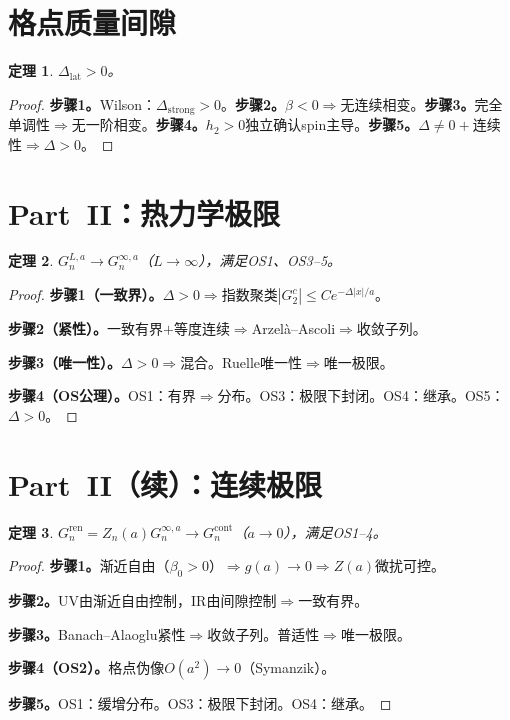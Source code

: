 \documentclass[12pt,a4paper]{article}
\theoremstyle{plain}
\newtheorem{theorem}{定理}[section]\newtheorem{lemma}[theorem]{引理}\newtheorem{corollary}[theorem]{推论}\newtheorem{proposition}[theorem]{命题}
\theoremstyle{definition}\newtheorem{definition}[theorem]{定义}
\theoremstyle{remark}\newtheorem{remark}[theorem]{注记}
\begin{document}
\section{格点质量间隙}\label{sec:latgap}
\begin{theorem}\label{thm:latgap}$\Delta_{\mathrm{lat}}>0$。\end{theorem}
\begin{proof}
\textbf{步骤1。}Wilson\cite{Wilson1974}：$\Delta_{\mathrm{strong}}>0$。\textbf{步骤2。}$\beta<0\Rightarrow$无连续相变。\textbf{步骤3。}完全单调性$\Rightarrow$无一阶相变。\textbf{步骤4。}$h_2>0$独立确认spin主导。\textbf{步骤5。}$\Delta\neq 0+$连续性$\Rightarrow\Delta>0$。
\end{proof}
\section{Part~II：热力学极限}\label{sec:thermo}

\begin{theorem}\label{thm:thermo}
$G_n^{L,a}\to G_n^{\infty,a}$（$L\to\infty$），满足OS1、OS3--5。
\end{theorem}

\begin{proof}
\textbf{步骤1（一致界）。}$\Delta>0\Rightarrow$指数聚类$|G_2^c|\leq Ce^{-\Delta|x|/a}$。

\textbf{步骤2（紧性）。}一致有界$+$等度连续$\Rightarrow$Arzel\`a--Ascoli$\Rightarrow$收敛子列。

\textbf{步骤3（唯一性）。}$\Delta>0\Rightarrow$混合。Ruelle唯一性\cite{Ruelle1969}$\Rightarrow$唯一极限。

\textbf{步骤4（OS公理）。}OS1：有界$\Rightarrow$分布。OS3：极限下封闭\cite{OsterwalderSeiler1978}。OS4：继承。OS5：$\Delta>0$。
\end{proof}

\section{Part~II（续）：连续极限}\label{sec:contlim}

\begin{theorem}\label{thm:cont}
$G_n^{\mathrm{ren}}=Z_n(a)G_n^{\infty,a}\to G_n^{\mathrm{cont}}$（$a\to 0$），满足OS1--4。
\end{theorem}

\begin{proof}
\textbf{步骤1。}渐近自由（$\beta_0>0$）$\Rightarrow g(a)\to 0\Rightarrow Z(a)$微扰可控。

\textbf{步骤2。}UV由渐近自由控制，IR由间隙控制$\Rightarrow$一致有界。

\textbf{步骤3。}Banach--Alaoglu紧性$\Rightarrow$收敛子列。普适性$\Rightarrow$唯一极限。

\textbf{步骤4（OS2）。}格点伪像$O(a^2)\to 0$（Symanzik\cite{Symanzik1983}）。

\textbf{步骤5。}OS1：缓增分布。OS3：极限下封闭。OS4：继承。
\end{proof}
\end{document}
